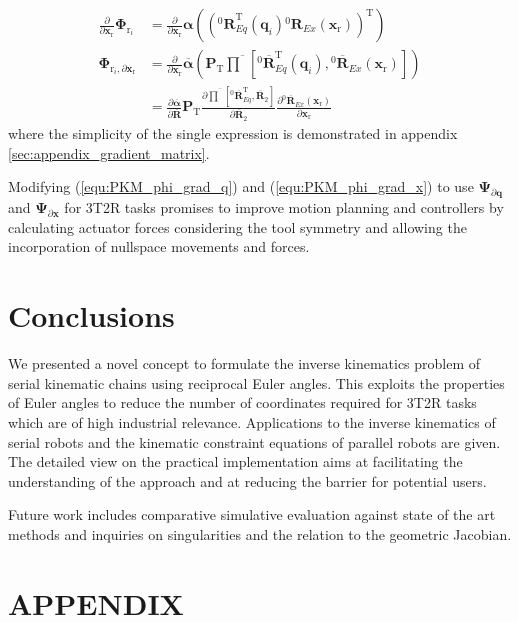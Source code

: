 \documentclass[twocolumn,10pt]{IFTOMM}
\newcommand{\bm}[1]{\boldsymbol{#1}}
\newcommand{\rotmat}[2]{{{ }^{#1}\boldsymbol{R}}_{#2}}
\newcommand{\rotmato}[2]{{{ }^{#1}\boldsymbol{\overline{R}}}_{#2}}
\newcommand{\transp}[0]{{\mathrm{T}}}
\begin{document}
\begin{align}
\frac{\partial}{\partial \bm{x}_{\mathrm{r}}}\bm{\Phi}_{\mathrm{r}_i}
&=
\frac{\partial}{\partial \bm{x}_{\mathrm{r}}} \bm{\alpha}\left((\rotmat{0}{Eq}^\transp(\bm{q}_i) \rotmat{0}{Ex}(\bm{x}_{\mathrm{r}}))^\transp\right) \label{equ:grad_Phi_x} \\
\bm{\Phi}_{\mathrm{r}_i,\partial \bm{x}_{\mathrm{r}}} 
&=
\frac{\partial}{\partial \bm{x}_{\mathrm{r}}} \overline{\bm{\alpha}}\left(
\bm{P}_{\mathrm{T}}
\overline{\prod}\left[ \rotmato{0}{Eq}^\transp(\bm{q}_i), \rotmato{0}{Ex}(\bm{x}_{\mathrm{r}})\right]\right) \nonumber \\
&=
\frac{\partial \overline{\bm{\alpha}}}{\partial \overline{\bm{R}}}
\bm{P}_{\mathrm{T}}
\frac{\partial \overline{\prod}\left[ \rotmato{0}{Eq}^\transp, \overline{\bm{R}}_2\right]}{\partial \overline{\bm{R}}_2}
\frac{\partial \rotmato{0}{Ex}(\bm{x}_{\mathrm{r}})}{\partial \bm{x}_{\mathrm{r}}} \nonumber
\end{align}
%
where the simplicity of the single expression is demonstrated in appendix\,\ref{sec:appendix_gradient_matrix}.

Modifying (\ref{equ:PKM_phi_grad_q}) and (\ref{equ:PKM_phi_grad_x}) to use $\bm{\Psi}_{\partial \bm{q}}$ and $\bm{\Psi}_{\partial \bm{x}}$ for 3T2R tasks promises to improve motion planning and controllers by calculating actuator forces considering the tool symmetry and allowing the incorporation of nullspace movements and forces.

\section{Conclusions}
\label{sec:Conclusion}

We presented a novel concept to formulate the inverse kinematics problem of serial kinematic chains using reciprocal Euler angles.
This exploits the properties of Euler angles to reduce the number of coordinates required for 3T2R tasks which are of high industrial relevance.
Applications to the inverse kinematics of serial robots and the kinematic constraint equations of parallel robots are given.
The detailed view on the practical implementation aims at facilitating the understanding of the approach and at reducing the barrier for potential users.

Future work includes comparative simulative evaluation against state of the art methods and inquiries on singularities and the relation to the geometric Jacobian.

\section{APPENDIX}
\end{document}
